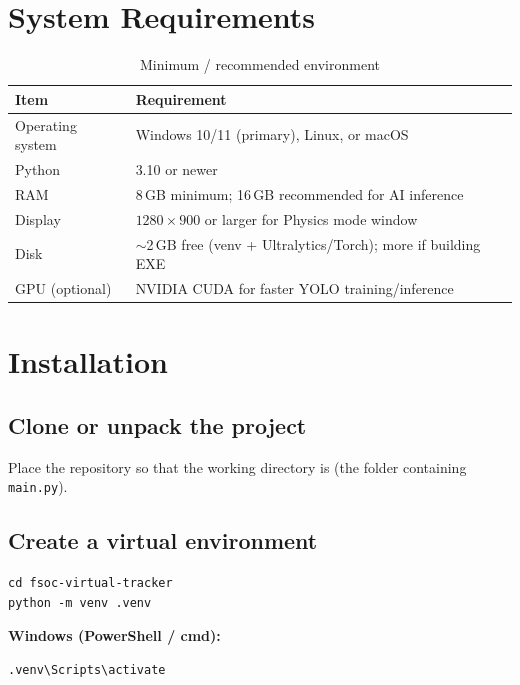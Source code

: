 \documentclass[11pt,a4paper]{article}
\begin{document}
\section{System Requirements}

\begin{table}[H]
\centering
\caption{Minimum / recommended environment}
\label{tab:reqs}
\small
\begin{tabular}{@{}ll@{}}
\toprule
\textbf{Item} & \textbf{Requirement} \\
\midrule
Operating system & Windows 10/11 (primary), Linux, or macOS \\
Python & 3.10 or newer \\
RAM & 8\,GB minimum; 16\,GB recommended for AI inference \\
Display & $1280\times900$ or larger for Physics mode window \\
Disk & $\sim$2\,GB free (venv + Ultralytics/Torch); more if building EXE \\
GPU (optional) & NVIDIA CUDA for faster YOLO training/inference \\
\bottomrule
\end{tabular}
\end{table}

\section{Installation}

\subsection{Clone or unpack the project}
Place the repository so that the working directory is  (the folder containing \texttt{main.py}).

\subsection{Create a virtual environment}
\begin{lstlisting}
cd fsoc-virtual-tracker
python -m venv .venv
\end{lstlisting}

\noindent\textbf{Windows (PowerShell / cmd):}
\begin{lstlisting}
.venv\Scripts\activate
\end{lstlisting}
\end{document}
